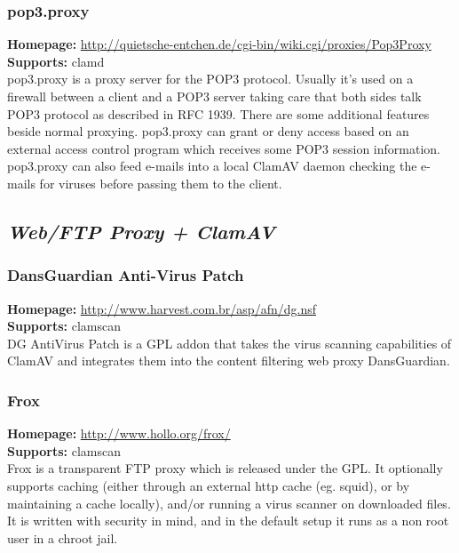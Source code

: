 \documentclass[a4paper,titlepage,12pt]{article}
\begin{document}
    \subsubsection{pop3.proxy}
    \textbf{Homepage:} \url{http://quietsche-entchen.de/cgi-bin/wiki.cgi/proxies/Pop3Proxy}\\
    \textbf{Supports:} clamd\\[4pt]
     pop3.proxy is a proxy server for the POP3 protocol. Usually it's used on
     a firewall between a client and a POP3 server taking care that both sides
     talk POP3 protocol as described in RFC 1939. There are some additional
     features beside normal proxying. pop3.proxy can grant or deny access
     based on an external access control program which receives some POP3
     session information. pop3.proxy can also feed e-mails into a local
     ClamAV daemon checking the e-mails for viruses before passing them to
     the client. 

    \subsection{\emph{Web/FTP Proxy + ClamAV}}

    \subsubsection{DansGuardian Anti-Virus Patch}
    \textbf{Homepage:} \url{http://www.harvest.com.br/asp/afn/dg.nsf}\\
    \textbf{Supports:} clamscan\\[4pt]
    DG AntiVirus Patch is a GPL addon that takes the virus scanning
    capabilities of ClamAV and integrates them into the content filtering
    web proxy DansGuardian.

    \subsubsection{Frox}
    \textbf{Homepage:} \url{http://www.hollo.org/frox/}\\
    \textbf{Supports:} clamscan\\[4pt]
    Frox is a transparent FTP proxy which is released under the GPL. It
    optionally supports caching (either through an external http cache
    (eg. squid), or by maintaining a cache locally), and/or running a virus
    scanner on downloaded files. It is written with security in mind, and in
    the default setup it runs as a non root user in a chroot jail.
\end{document}
